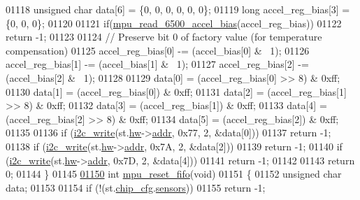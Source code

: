 \begin{DoxyCode}
{{{{01118     \textcolor{keywordtype}{unsigned} \textcolor{keywordtype}{char} data[6] = \{0, 0, 0, 0, 0, 0\};
01119     \textcolor{keywordtype}{long} accel\_reg\_bias[3] = \{0, 0, 0\};
01120 
01121     \textcolor{keywordflow}{if}(\hyperlink{group___d_r_i_v_e_r_s_ga57bfbb356ce449135ce39659455041ae}{mpu\_read\_6500\_accel\_bias}(accel\_reg\_bias))
01122         \textcolor{keywordflow}{return} -1;
01123 
01124     \textcolor{comment}{// Preserve bit 0 of factory value (for temperature compensation)}
01125     accel\_reg\_bias[0] -= (accel\_bias[0] & ~1);
01126     accel\_reg\_bias[1] -= (accel\_bias[1] & ~1);
01127     accel\_reg\_bias[2] -= (accel\_bias[2] & ~1);
01128 
01129     data[0] = (accel\_reg\_bias[0] >> 8) & 0xff;
01130     data[1] = (accel\_reg\_bias[0]) & 0xff;
01131     data[2] = (accel\_reg\_bias[1] >> 8) & 0xff;
01132     data[3] = (accel\_reg\_bias[1]) & 0xff;
01133     data[4] = (accel\_reg\_bias[2] >> 8) & 0xff;
01134     data[5] = (accel\_reg\_bias[2]) & 0xff;
01135 
01136     \textcolor{keywordflow}{if} (\hyperlink{_i2_c_8c_ac0f145afe8d662af199043939f4398d6}{i2c\_write}(st.\hyperlink{structgyro__state__s_a5bac30a96752691e4cc723735060e360}{hw}->\hyperlink{structhw__s_a4c34a946600e9d68b6355d23f54d291b}{addr}, 0x77, 2, &data[0]))
01137         \textcolor{keywordflow}{return} -1;
01138     \textcolor{keywordflow}{if} (\hyperlink{_i2_c_8c_ac0f145afe8d662af199043939f4398d6}{i2c\_write}(st.\hyperlink{structgyro__state__s_a5bac30a96752691e4cc723735060e360}{hw}->\hyperlink{structhw__s_a4c34a946600e9d68b6355d23f54d291b}{addr}, 0x7A, 2, &data[2]))
01139         \textcolor{keywordflow}{return} -1;
01140     \textcolor{keywordflow}{if} (\hyperlink{_i2_c_8c_ac0f145afe8d662af199043939f4398d6}{i2c\_write}(st.\hyperlink{structgyro__state__s_a5bac30a96752691e4cc723735060e360}{hw}->\hyperlink{structhw__s_a4c34a946600e9d68b6355d23f54d291b}{addr}, 0x7D, 2, &data[4]))
01141         \textcolor{keywordflow}{return} -1;
01142 
01143     \textcolor{keywordflow}{return} 0;
01144 \}
01145 
\hypertarget{inv__mpu_8c_source.tex_l01150}{}\hyperlink{group___d_r_i_v_e_r_s_gaf23e9f57c0059be6ec57862f0584de10}{01150} \textcolor{keywordtype}{int} \hyperlink{group___d_r_i_v_e_r_s_gaf23e9f57c0059be6ec57862f0584de10}{mpu\_reset\_fifo}(\textcolor{keywordtype}{void})
01151 \{
01152     \textcolor{keywordtype}{unsigned} \textcolor{keywordtype}{char} data;
01153 
01154     \textcolor{keywordflow}{if} (!(st.\hyperlink{structgyro__state__s_ac895217592e2084bd520b0be8e9d20ee}{chip\_cfg}.\hyperlink{structchip__cfg__s_aaa21c01566947e7007476657cb614e3f}{sensors}))
01155         \textcolor{keywordflow}{return} -1;
}}}}
\end{DoxyCode}
